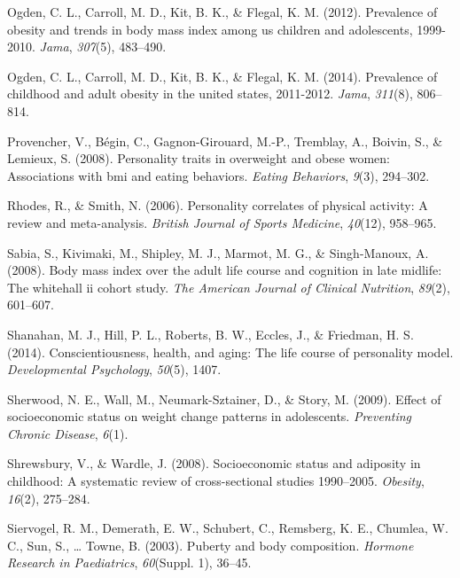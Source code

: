 \documentclass[man]{apa6}
\begin{document}
\leavevmode\hypertarget{ref-ogden2012prevalence}{}%
Ogden, C. L., Carroll, M. D., Kit, B. K., \& Flegal, K. M. (2012). Prevalence of obesity and trends in body mass index among us children and adolescents, 1999-2010. \emph{Jama}, \emph{307}(5), 483--490.

\leavevmode\hypertarget{ref-ogden2014prevalence}{}%
Ogden, C. L., Carroll, M. D., Kit, B. K., \& Flegal, K. M. (2014). Prevalence of childhood and adult obesity in the united states, 2011-2012. \emph{Jama}, \emph{311}(8), 806--814.

\leavevmode\hypertarget{ref-provencher2008personality}{}%
Provencher, V., Bégin, C., Gagnon-Girouard, M.-P., Tremblay, A., Boivin, S., \& Lemieux, S. (2008). Personality traits in overweight and obese women: Associations with bmi and eating behaviors. \emph{Eating Behaviors}, \emph{9}(3), 294--302.

\leavevmode\hypertarget{ref-rhodes2006personality}{}%
Rhodes, R., \& Smith, N. (2006). Personality correlates of physical activity: A review and meta-analysis. \emph{British Journal of Sports Medicine}, \emph{40}(12), 958--965.

\leavevmode\hypertarget{ref-sabia2008body}{}%
Sabia, S., Kivimaki, M., Shipley, M. J., Marmot, M. G., \& Singh-Manoux, A. (2008). Body mass index over the adult life course and cognition in late midlife: The whitehall ii cohort study. \emph{The American Journal of Clinical Nutrition}, \emph{89}(2), 601--607.

\leavevmode\hypertarget{ref-shanahan2014conscientiousness}{}%
Shanahan, M. J., Hill, P. L., Roberts, B. W., Eccles, J., \& Friedman, H. S. (2014). Conscientiousness, health, and aging: The life course of personality model. \emph{Developmental Psychology}, \emph{50}(5), 1407.

\leavevmode\hypertarget{ref-neumarkeffect}{}%
Sherwood, N. E., Wall, M., Neumark-Sztainer, D., \& Story, M. (2009). Effect of socioeconomic status on weight change patterns in adolescents. \emph{Preventing Chronic Disease}, \emph{6}(1).

\leavevmode\hypertarget{ref-shrewsbury2008socioeconomic}{}%
Shrewsbury, V., \& Wardle, J. (2008). Socioeconomic status and adiposity in childhood: A systematic review of cross-sectional studies 1990--2005. \emph{Obesity}, \emph{16}(2), 275--284.

\leavevmode\hypertarget{ref-siervogel2003puberty}{}%
Siervogel, R. M., Demerath, E. W., Schubert, C., Remsberg, K. E., Chumlea, W. C., Sun, S., \ldots{} Towne, B. (2003). Puberty and body composition. \emph{Hormone Research in Paediatrics}, \emph{60}(Suppl. 1), 36--45.
\end{document}
